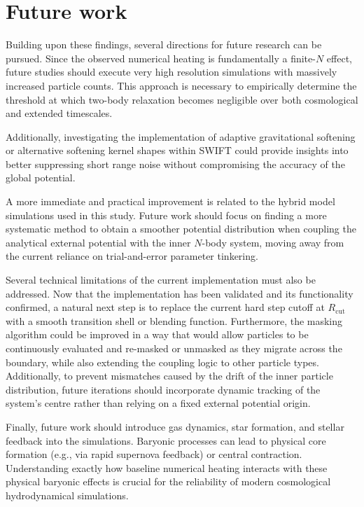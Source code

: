 \section{Future work}
Building upon these findings, several directions for future research can be pursued. Since the observed numerical heating is fundamentally a finite-$N$ effect, future studies should execute very high resolution simulations with massively increased particle counts. This approach is necessary to empirically determine the threshold at which two-body relaxation becomes negligible over both cosmological and extended timescales.

Additionally, investigating the implementation of adaptive gravitational softening or alternative softening kernel shapes within SWIFT could provide insights into better suppressing short range noise without compromising the accuracy of the global potential.

A more immediate and practical improvement is related to the hybrid model simulations used in this study. Future work should focus on finding a more systematic method to obtain a smoother potential distribution when coupling the analytical external potential with the inner $N$-body system, moving away from the current reliance on trial-and-error parameter tinkering.

Several technical limitations of the current implementation must also be addressed. Now that the implementation has been validated and its functionality confirmed, a natural next step is to replace the current hard step cutoff at $R_{\mathrm{cut}}$ with a smooth transition shell or blending function. Furthermore, the masking algorithm could be improved in a way that would allow particles to be continuously evaluated and re-masked or unmasked as they migrate across the boundary, while also extending the coupling logic to other particle types. Additionally, to prevent mismatches caused by the drift of the inner particle distribution, future iterations should incorporate dynamic tracking of the system's centre rather than relying on a fixed external potential origin.

Finally, future work should introduce gas dynamics, star formation, and stellar feedback into the simulations. Baryonic processes can lead to physical core formation (e.g., via rapid supernova feedback) or central contraction. Understanding exactly how baseline numerical heating interacts with these physical baryonic effects is crucial for the reliability of modern cosmological hydrodynamical simulations.
